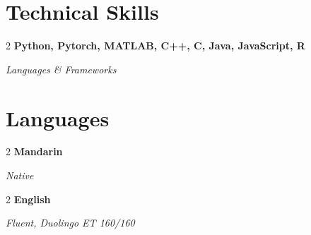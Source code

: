 \documentclass[10pt, letterpaper]{article}
\newenvironment{twocolentry}[2][]{
    \onecolentry
    \def\secondColumn{#2}
    \setcolumnwidth{\fill, 4.5 cm}
    \begin{paracol}{2}
}{
    \switchcolumn \raggedleft \secondColumn
    \end{paracol}
    \endonecolentry
} %
\begin{document}
    
    \section{Technical Skills}



        
        \begin{twocolentry}
            {%
            \textit{Languages \& Frameworks} %
            }{%
            \textbf{Python, Pytorch, MATLAB, C++, C, Java, JavaScript, R}  %
            }
        \end{twocolentry}



    
    \section{Languages}



        
        \begin{twocolentry}
            {%
            \textit{Native} %
            }{%
            \textbf{Mandarin}  %
            }
        \end{twocolentry}


        \vspace{0.2 cm}

        \begin{twocolentry}
            {%
            \textit{Fluent, Duolingo ET 160/160} %
            }{%
            \textbf{English}  %
            }
        \end{twocolentry}



    
\end{document}
